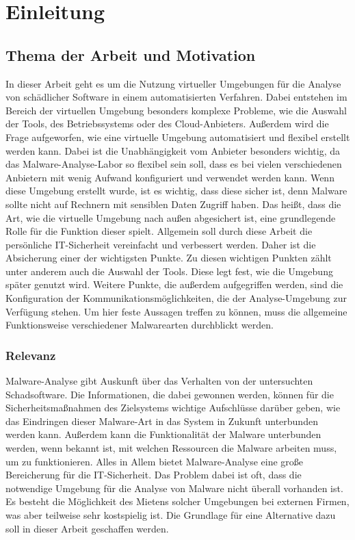 \section{Einleitung} 

\subsection{Thema der Arbeit und Motivation}
In dieser Arbeit geht es um die Nutzung virtueller Umgebungen für die Analyse von schädlicher Software in einem automatisierten Verfahren. Dabei entstehen im Bereich der virtuellen Umgebung besonders komplexe Probleme, wie die Auswahl der Tools, des Betriebssystems oder des Cloud-Anbieters. Außerdem wird die Frage aufgeworfen, wie eine virtuelle Umgebung automatisiert und flexibel erstellt werden kann. Dabei ist die Unabhängigkeit vom Anbieter besonders wichtig, da das Malware-Analyse-Labor so flexibel sein soll, dass es bei vielen verschiedenen Anbietern mit wenig Aufwand konfiguriert und verwendet werden kann. 
\newline 
Wenn diese Umgebung erstellt wurde, ist es wichtig, dass diese sicher ist, denn Malware sollte nicht auf Rechnern mit sensiblen Daten Zugriff haben. Das heißt, dass die Art, wie die virtuelle Umgebung nach außen abgesichert ist, eine grundlegende Rolle für die Funktion dieser spielt. Allgemein soll durch diese Arbeit die persönliche IT-Sicherheit vereinfacht und verbessert werden. Daher ist die Absicherung einer der wichtigsten Punkte. Zu diesen wichtigen Punkten zählt unter anderem auch die Auswahl der Tools. Diese legt fest, wie die Umgebung später genutzt wird.
\newline
Weitere Punkte, die außerdem aufgegriffen werden, sind die Konfiguration der Kommunikationsmöglichkeiten, die der Analyse-Umgebung zur Verfügung stehen. Um hier feste Aussagen treffen zu können, muss die allgemeine Funktionsweise verschiedener Malwarearten durchblickt werden.
\subsubsection{Relevanz}
Malware-Analyse gibt Auskunft über das Verhalten von der untersuchten Schadsoftware. Die Informationen, die dabei gewonnen werden, können für die Sicherheitsmaßnahmen des Zielsystems wichtige Aufschlüsse darüber geben, wie das Eindringen dieser Malware-Art in das System in Zukunft unterbunden werden kann.
\newline Außerdem kann die Funktionalität der Malware unterbunden werden, wenn bekannt ist, mit welchen Ressourcen die Malware arbeiten muss, um zu funktionieren. Alles in Allem bietet Malware-Analyse eine große Bereicherung für die IT-Sicherheit. Das Problem dabei ist oft, dass die notwendige Umgebung für die Analyse von Malware nicht überall vorhanden ist. Es besteht die Möglichkeit des Mietens solcher Umgebungen bei externen Firmen, was aber teilweise sehr kostspielig ist. Die Grundlage für eine Alternative dazu soll in dieser Arbeit geschaffen werden.
